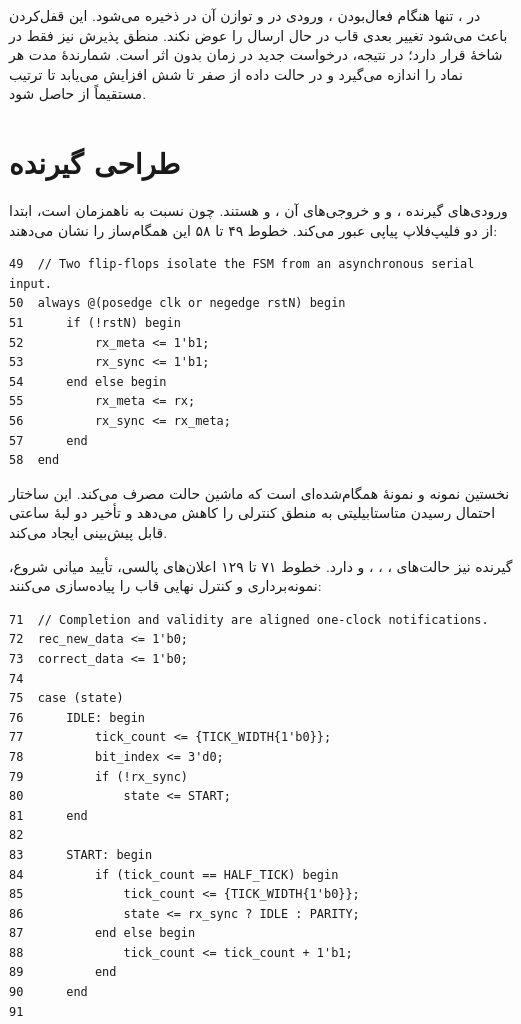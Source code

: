 در ، تنها هنگام فعال‌بودن ، ورودی در  و
توازن آن در  ذخیره می‌شود. این قفل‌کردن باعث
می‌شود تغییر بعدی
 قاب در حال ارسال را عوض نکند. منطق پذیرش نیز فقط در شاخهٔ 
قرار دارد؛ در نتیجه، درخواست جدید در زمان  بدون اثر است. شمارندهٔ
 مدت هر نماد را اندازه می‌گیرد و  در حالت داده از صفر تا
شش افزایش می‌یابد تا ترتیب  مستقیماً از
 حاصل شود.


\section{طراحی گیرنده}

ورودی‌های گیرنده ،  و  و خروجی‌های آن
،  و  هستند. چون
 نسبت به  ناهمزمان است، ابتدا از دو
فلیپ‌فلاپ پیاپی عبور می‌کند. خطوط ۴۹ تا ۵۸ این
همگام‌ساز را نشان می‌دهند:

\begin{dsdlcodeblock}
\begin{verbatim}
49  // Two flip-flops isolate the FSM from an asynchronous serial input.
50  always @(posedge clk or negedge rstN) begin
51      if (!rstN) begin
52          rx_meta <= 1'b1;
53          rx_sync <= 1'b1;
54      end else begin
55          rx_meta <= rx;
56          rx_sync <= rx_meta;
57      end
58  end
\end{verbatim}
\end{dsdlcodeblock}

 نخستین نمونه و  نمونهٔ همگام‌شده‌ای است که ماشین حالت
مصرف می‌کند. این ساختار احتمال رسیدن متاستابیلیتی به منطق
کنترلی را کاهش می‌دهد و تأخیر
دو لبهٔ ساعتی قابل پیش‌بینی ایجاد می‌کند.

گیرنده نیز حالت‌های ، ، ،  و
 دارد. خطوط ۷۱ تا ۱۲۹ اعلان‌های پالسی، تأیید میانی شروع، نمونه‌برداری و کنترل
نهایی قاب را پیاده‌سازی می‌کنند:

\begin{dsdlcodeblock}
\begin{verbatim}
71  // Completion and validity are aligned one-clock notifications.
72  rec_new_data <= 1'b0;
73  correct_data <= 1'b0;
74
75  case (state)
76      IDLE: begin
77          tick_count <= {TICK_WIDTH{1'b0}};
78          bit_index <= 3'd0;
79          if (!rx_sync)
80              state <= START;
81      end
82
83      START: begin
84          if (tick_count == HALF_TICK) begin
85              tick_count <= {TICK_WIDTH{1'b0}};
86              state <= rx_sync ? IDLE : PARITY;
87          end else begin
88              tick_count <= tick_count + 1'b1;
89          end
90      end
91
\end{verbatim}
\end{dsdlcodeblock}

